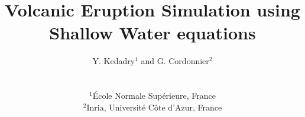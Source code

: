 

\title[EG \LaTeX\ Volcanic Eruption Simulation]%
      {Volcanic Eruption Simulation using Shallow Water equations}

\author[Y. Kedadry \& G. Cordonnier]
{\parbox{\textwidth}{\centering Y. Kedadry$^{1}$
        and G. Cordonnier$^{2}$
        }
        \\
{\parbox{\textwidth}{\centering $^1$École Normale Supérieure, France\\
         $^2$Inria, Université Côte d’Azur, France
       }
}
}

%



\maketitle













\nocite{*}



